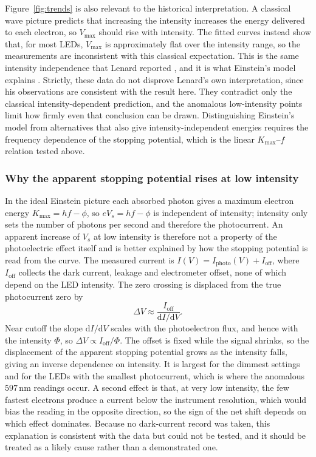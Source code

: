 \documentclass[12pt,a4paper]{article}
\begin{document}
Figure~\ref{fig:trends} is also relevant to the historical interpretation. A classical wave picture predicts that increasing the intensity increases the energy delivered to each electron, so \(V_{\max}\) should rise with intensity. The fitted curves instead show that, for most LEDs, \(V_{\max}\) is approximately flat over the intensity range, so the measurements are inconsistent with this classical expectation. This is the same intensity independence that Lenard reported \cite{lenard1902}, and it is what Einstein's model explains \cite{einstein1905}. Strictly, these data do not disprove Lenard's own interpretation, since his observations are consistent with the result here. They contradict only the classical intensity-dependent prediction, and the anomalous low-intensity points limit how firmly even that conclusion can be drawn. Distinguishing Einstein's model from alternatives that also give intensity-independent energies requires the frequency dependence of the stopping potential, which is the linear \(K_{\max}\)--\(f\) relation tested above.

\subsubsection{Why the apparent stopping potential rises at low intensity}

In the ideal Einstein picture each absorbed photon gives a maximum electron energy \(K_{\max}=hf-\phi\), so \(eV_s=hf-\phi\) is independent of intensity; intensity only sets the number of photons per second and therefore the photocurrent. An apparent increase of \(V_s\) at low intensity is therefore not a property of the photoelectric effect itself and is better explained by how the stopping potential is read from the curve. The measured current is \(I(V)=I_{\mathrm{photo}}(V)+I_{\mathrm{off}}\), where \(I_{\mathrm{off}}\) collects the dark current, leakage and electrometer offset, none of which depend on the LED intensity. The zero crossing is displaced from the true photocurrent zero by
\[
\Delta V\approx\frac{I_{\mathrm{off}}}{\mathrm{d}I/\mathrm{d}V}.
\]
Near cutoff the slope \(\mathrm{d}I/\mathrm{d}V\) scales with the photoelectron flux, and hence with the intensity \(\Phi\), so \(\Delta V\propto I_{\mathrm{off}}/\Phi\). The offset is fixed while the signal shrinks, so the displacement of the apparent stopping potential grows as the intensity falls, giving an inverse dependence on intensity. It is largest for the dimmest settings and for the LEDs with the smallest photocurrent, which is where the anomalous \(597\,\mathrm{nm}\) readings occur. A second effect is that, at very low intensity, the few fastest electrons produce a current below the instrument resolution, which would bias the reading in the opposite direction, so the sign of the net shift depends on which effect dominates. Because no dark-current record was taken, this explanation is consistent with the data but could not be tested, and it should be treated as a likely cause rather than a demonstrated one.
\end{document}
